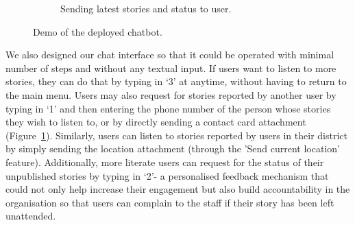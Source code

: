 \begin{figure}[t]
\begin{subfigure}[b]{0.48\textwidth}
    \caption{Sending latest stories and status to user.}
    \label{fig:menu_contactcard_anony}
    \end{subfigure}
    \caption{Demo of the deployed chatbot.}
    \label{fig:two graphs}
\end{figure}

We also designed our chat interface so that it could be operated with minimal number of steps and without any textual input. If users want to listen to more stories, they can do that by typing in `3' at anytime, without having to return to the main menu. Users may also request for stories reported by another user by typing in `1' and then entering the phone number of the person whose stories they wish to listen to, or by directly sending a contact card attachment (Figure~\ref{fig:menu_contactcard_anony}). Similarly, users can listen to stories reported by users in their district by simply sending the location attachment (through the 'Send current location' feature). Additionally, more literate users can request for the status of their unpublished stories by typing in `2'- a personalised feedback mechanism that could not only help increase their engagement but also build accountability in the organisation so that users can complain to the staff if their story has been left unattended. 


